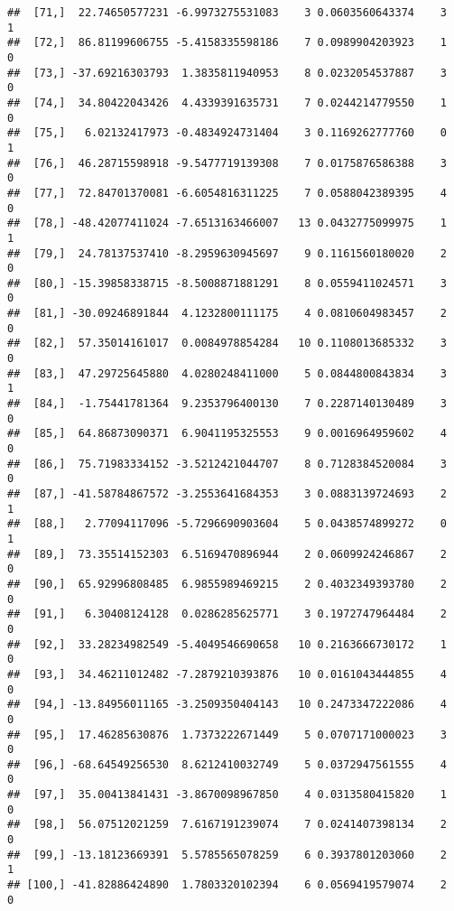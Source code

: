 \documentclass[]{article}
\begin{document}
\begin{verbatim}
##  [71,]  22.74650577231 -6.9973275531083    3 0.0603560643374    3    1
##  [72,]  86.81199606755 -5.4158335598186    7 0.0989904203923    1    0
##  [73,] -37.69216303793  1.3835811940953    8 0.0232054537887    3    0
##  [74,]  34.80422043426  4.4339391635731    7 0.0244214779550    1    0
##  [75,]   6.02132417973 -0.4834924731404    3 0.1169262777760    0    1
##  [76,]  46.28715598918 -9.5477719139308    7 0.0175876586388    3    0
##  [77,]  72.84701370081 -6.6054816311225    7 0.0588042389395    4    0
##  [78,] -48.42077411024 -7.6513163466007   13 0.0432775099975    1    1
##  [79,]  24.78137537410 -8.2959630945697    9 0.1161560180020    2    0
##  [80,] -15.39858338715 -8.5008871881291    8 0.0559411024571    3    0
##  [81,] -30.09246891844  4.1232800111175    4 0.0810604983457    2    0
##  [82,]  57.35014161017  0.0084978854284   10 0.1108013685332    3    0
##  [83,]  47.29725645880  4.0280248411000    5 0.0844800843834    3    1
##  [84,]  -1.75441781364  9.2353796400130    7 0.2287140130489    3    0
##  [85,]  64.86873090371  6.9041195325553    9 0.0016964959602    4    0
##  [86,]  75.71983334152 -3.5212421044707    8 0.7128384520084    3    0
##  [87,] -41.58784867572 -3.2553641684353    3 0.0883139724693    2    1
##  [88,]   2.77094117096 -5.7296690903604    5 0.0438574899272    0    1
##  [89,]  73.35514152303  6.5169470896944    2 0.0609924246867    2    0
##  [90,]  65.92996808485  6.9855989469215    2 0.4032349393780    2    0
##  [91,]   6.30408124128  0.0286285625771    3 0.1972747964484    2    0
##  [92,]  33.28234982549 -5.4049546690658   10 0.2163666730172    1    0
##  [93,]  34.46211012482 -7.2879210393876   10 0.0161043444855    4    0
##  [94,] -13.84956011165 -3.2509350404143   10 0.2473347222086    4    0
##  [95,]  17.46285630876  1.7373222671449    5 0.0707171000023    3    0
##  [96,] -68.64549256530  8.6212410032749    5 0.0372947561555    4    0
##  [97,]  35.00413841431 -3.8670098967850    4 0.0313580415820    1    0
##  [98,]  56.07512021259  7.6167191239074    7 0.0241407398134    2    0
##  [99,] -13.18123669391  5.5785565078259    6 0.3937801203060    2    1
## [100,] -41.82886424890  1.7803320102394    6 0.0569419579074    2    0
\end{verbatim}
\end{document}
